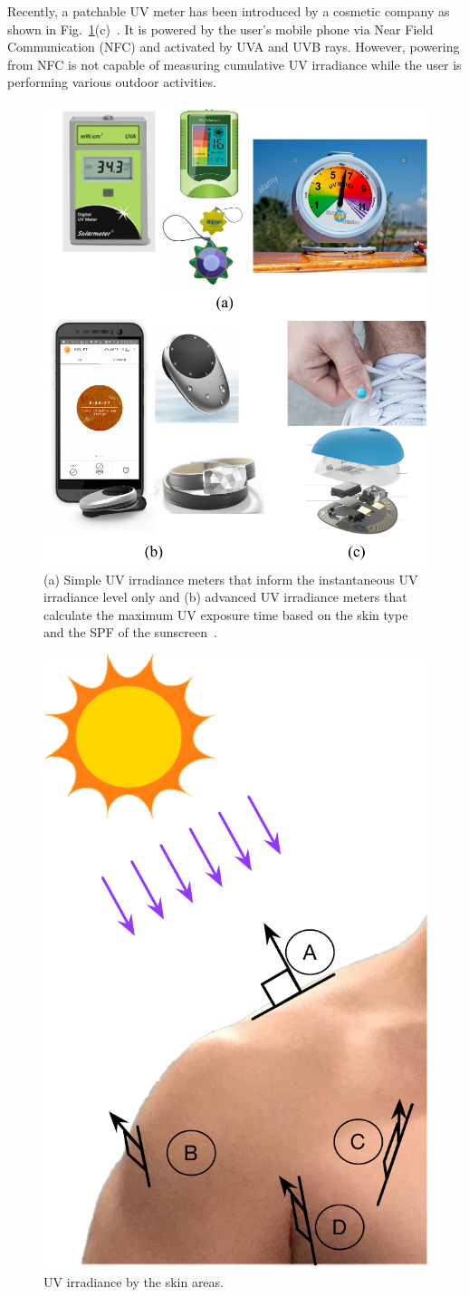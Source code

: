 \documentclass[journal]{IEEEtran}
\begin{document}
Recently, a patchable UV meter has been introduced by a cosmetic company as shown in Fig.~\ref{fig:UVI_meters}(c)~\cite{LOreal}. It is powered by the user's mobile phone via Near Field Communication (NFC) and activated by UVA and UVB rays. However, powering from NFC is not capable of measuring cumulative UV irradiance while the user is performing various outdoor activities.

\begin{figure}
\centering
\includegraphics[width=0.8\hsize]{Figures/UVI_meter.pdf}
\caption{(a) Simple UV irradiance meters that inform the instantaneous UV irradiance level only and (b) advanced UV irradiance meters that calculate the maximum UV exposure time based on the skin type and the SPF of the sunscreen~\cite{Netatmo, Ultra, LOreal}.}
\label{fig:UVI_meters}
\end{figure}

\begin{figure}
\centering
\includegraphics[width=0.4\hsize]{Figures/UV_skin_areas.pdf}
\caption{UV irradiance by the skin areas.}
\label{fig:UV_exposure_skin}
\end{figure}
\end{document}
